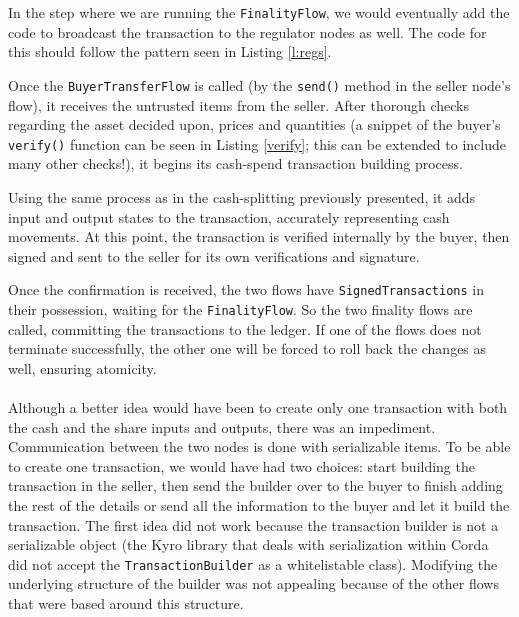 \documentclass[12pt,twoside]{article}
\begin{document}

In the step where we are running the \verb|FinalityFlow|, we would eventually add the code to broadcast the transaction to the regulator nodes as well. The code for this should follow the pattern seen in Listing \ref{l:regs}.

Once the \verb|BuyerTransferFlow| is called (by the \verb|send()| method in the seller node's flow), it receives the untrusted items from the seller. After thorough checks regarding the asset decided upon, prices and quantities (a snippet of the buyer's \verb|verify()| function can be seen in Listing \ref{verify}; this can be extended to include many other checks!), it begins its cash-spend transaction building process. 

Using the same process as in the cash-splitting previously presented, it adds input and output states to the transaction, accurately representing cash movements. At this point, the transaction is verified internally by the buyer, then signed and sent to the seller for its own verifications and signature.

Once the confirmation is received, the two flows have \verb|SignedTransactions| in their possession, waiting for the \verb|FinalityFlow|. So the two finality flows are called, committing the transactions to the ledger. If one of the flows does not terminate successfully, the other one will be forced to roll back the changes as well, ensuring atomicity. 
\\ \\
Although a better idea would have been to create only one transaction with both the cash and the share inputs and outputs, there was an impediment. Communication between the two nodes is done with serializable items. To be able to create one transaction, we would have had two choices: start building the transaction in the seller, then send the builder over to the buyer to finish adding the rest of the details or send all the information to the buyer and let it build the transaction. The first idea did not work because the transaction builder is not a serializable object (the Kyro library that deals with serialization within Corda did not accept the \verb|TransactionBuilder| as a whitelistable class). Modifying the underlying structure of the builder was not appealing because of the other flows that were based around this structure. 
\end{document}
